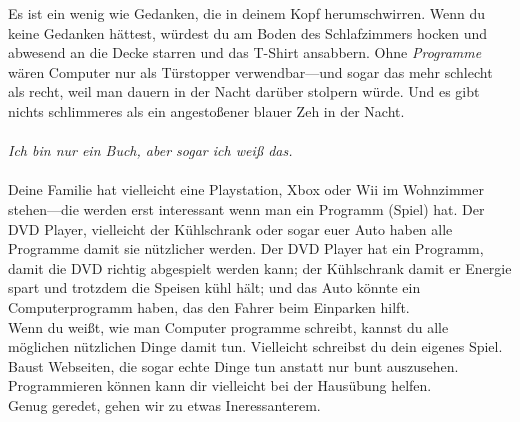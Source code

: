Es ist ein wenig wie Gedanken, die in deinem Kopf herumschwirren. Wenn du keine Gedanken hättest, würdest du am Boden des Schlafzimmers hocken und abwesend an die Decke starren und das T-Shirt ansabbern. Ohne \emph{Programme} wären Computer nur als Türstopper verwendbar---und sogar das mehr schlecht als recht, weil man dauern in der Nacht darüber stolpern würde. Und es gibt nichts schlimmeres als ein angestoßener blauer Zeh in der Nacht.
\\
\\
\emph{Ich bin nur ein Buch, aber sogar ich weiß das.}
\\
\\
Deine Familie hat vielleicht eine Playstation, Xbox oder Wii im Wohnzimmer stehen---die werden erst interessant wenn man ein Programm (Spiel) hat. Der DVD Player, vielleicht der Kühlschrank oder sogar euer Auto haben alle Programme damit sie nützlicher werden. Der DVD Player hat ein Programm, damit die DVD richtig abgespielt werden kann; der Kühlschrank damit er Energie spart und trotzdem die Speisen kühl hält; und das Auto könnte ein Computerprogramm haben, das den Fahrer beim Einparken hilft.\\
Wenn du weißt, wie man Computer programme schreibt, kannst du alle möglichen nützlichen Dinge damit tun. Vielleicht schreibst du dein eigenes Spiel. Baust Webseiten, die sogar echte Dinge tun anstatt nur bunt auszusehen. Programmieren können kann dir vielleicht bei der Hausübung helfen.
\\
Genug geredet, gehen wir zu etwas Ineressanterem.

